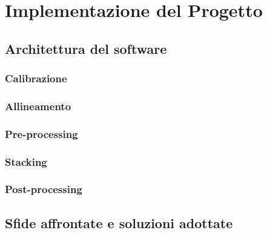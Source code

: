\chapter{Implementazione del Progetto} \label{chap:implementation}

\section{Architettura del software}

\subsection{Calibrazione}

\subsection{Allineamento}

\subsection{Pre-processing}

\subsection{Stacking}

\subsection{Post-processing}

\section{Sfide affrontate e soluzioni adottate}

\cleardoublepage